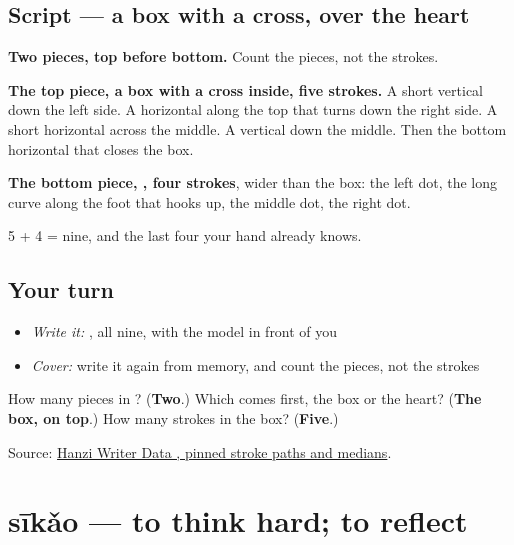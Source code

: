\subsection*{Script — a box with a cross, over the heart}

\begin{quote}
\end{quote}

\textbf{Two pieces, top before bottom.} Count the pieces, not the strokes.

\textbf{The top piece, a box with a cross inside, five strokes.} A short vertical down the left side. A horizontal along the top that turns down the right side. A short horizontal across the middle. A vertical down the middle. Then the bottom horizontal that closes the box.

\textbf{The bottom piece, , four strokes}, wider than the box: the left dot, the long curve along the foot that hooks up, the middle dot, the right dot.

5 + 4 = nine, and the last four your hand already knows.

\subsection*{Your turn}
\begin{itemize}
\raggedright
  \item \emph{Write it:} , all nine, with the model in front of you
  \item \emph{Cover:} write it again from memory, and count the pieces, not the strokes
\end{itemize}

\begin{tcolorbox}[breakable,colback=teal!4,colframe=teal!35!black,title={Before you move on}]
How many pieces in ? (\textbf{Two}.) Which comes first, the box or the heart? (\textbf{The box, on top}.) How many strokes in the box? (\textbf{Five}.)

Source: \href{https://raw.githubusercontent.com/chanind/hanzi-writer-data/68d10a4b21150cae5e1ebbd223eed289cf32d90c/data/\%E6\%80\%9D.json}{Hanzi Writer Data , pinned stroke paths and medians}.
\end{tcolorbox}
\section[sīkǎo]{sīkǎo — to think hard; to reflect}

